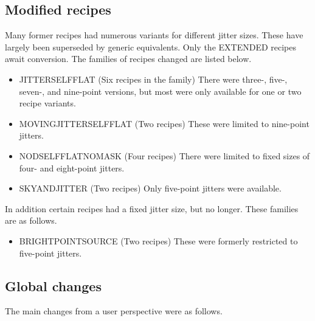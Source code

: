 \documentclass[twoside,11pt]{article}
\newcommand{\htmlref}[2]{#1}
\renewcommand{\_}{\texttt{\symbol{95}}}
\begin{document}
\subsection{Modified recipes}
Many former recipes had numerous variants for different jitter sizes.
These have largely been superseded by generic equivalents.  Only the
EXTENDED recipes await conversion.  The families of recipes changed
are listed below.

\begin{itemize}
    \item \htmlref{JITTER\_SELF\_FLAT}{JITTER\_SELF\_FLAT} 
          (Six recipes in the family)  There were three-,
          five-, seven-, and nine-point versions, but most were only
          available for one or two recipe variants.
    \item \htmlref{MOVING\_JITTER\_SELF\_FLAT}{MOVING\_JITTER\_SELF\_FLAT} 
          (Two recipes)  These were limited to nine-point jitters.
    \item \htmlref{NOD\_SELF\_FLAT\_NO\_MASK}{NOD\_SELF\_FLAT\_NO\_MASK}
          (Four recipes) There were limited to fixed sizes of four- and
          eight-point jitters.
    \item \htmlref{SKY\_AND\_JITTER}{SKY\_AND\_JITTER} (Two recipes)
          Only five-point jitters were available.
\end{itemize}

In addition certain recipes had a fixed jitter size, but no longer.
These families are as follows.

\begin{itemize}
    \item \htmlref{BRIGHT\_POINT\_SOURCE}{BRIGHT\_POINT\_SOURCE} (Two recipes)
       These were formerly restricted to five-point jitters.
\end{itemize}

\subsection{Global changes}

The main changes from a user perspective were as follows.
\end{document}
